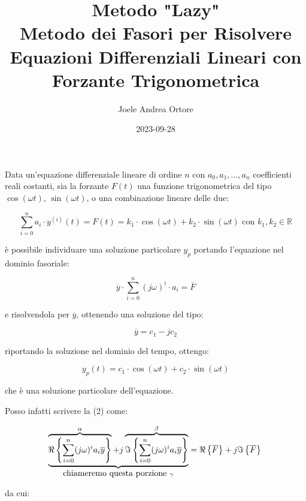 \documentclass[11pt,italian]{article}
\title{Metodo "Lazy"\\ \large Metodo dei Fasori per Risolvere Equazioni Differenziali Lineari con Forzante Trigonometrica}
\author{Joele Andrea Ortore}
\date{2023-09-28}
\theoremstyle{remark}
\begin{document}
\maketitle

Data un'equazione differenziale lineare di ordine \(n\) con \(a_0, a_1, ..., a_n\) coefficienti reali costanti, sia la forzante \(F(t)\) una funzione trigonometrica del tipo \(\cos (\omega t)\), \(\sin (\omega t)\), o una combinazione lineare delle due:

\begin{equation}
    \sum_{i=0}^{n} a_i \cdot y^{(i)}(t) = F(t) = k_1 \cdot \cos (\omega t) + k_2 \cdot \sin (\omega t) \mbox{ con } k_1, k_2 \in \mathbb{R}
\end{equation}

è possibile individuare una soluzione particolare \(y_p\) portando l'equazione nel dominio fasoriale:

\begin{equation}
    \overline{y} \cdot \sum_{i=0}^{n} (j \omega)^i \cdot a_i = \overline{F}
\end{equation}

e risolvendola per \(\overline{y}\), ottenendo una soluzione del tipo:

\begin{equation*}
    \overline{y} = c_1 - j c_2
\end{equation*}

riportando la soluzione nel dominio del tempo, ottengo:

\begin{equation*}
    y_p(t) = c_1 \cdot \cos (\omega t) + c_2 \cdot \sin (\omega t)
\end{equation*}

che è una soluzione particolare dell'equazione.

Posso infatti scrivere la (2) come:

\begin{equation*}
    \underbrace{\overbrace{\Re\left\{\sum_{i=0}^n (j \omega)^i a_i \overline{y}\right\}}^{\alpha} + j \overbrace{\Im\left\{\sum_{i=0}^n (j \omega)^i a_i \overline{y}\right\}}^{\beta}}_{\mbox{chiameremo questa porzione } \gamma} = \Re\left\{\overline{F}\right\} + j \Im\left\{\overline{F}\right\}                                                                                                                                   \\
\end{equation*}


da cui:
\end{document}
